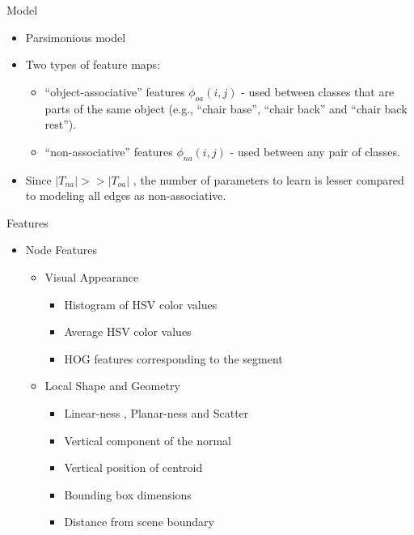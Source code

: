 \documentclass{beamer}
\newcommand{\fe}[3]{{\phi_{#1}(#2,#3)}}%
\begin{document}
\begin{frame}{Model}
\begin{itemize}
\item Parsimonious model

\item Two types of feature maps: 
\begin{itemize}
\item ``object-associative'' features $\fe{oa}{i}{j}$ - used between classes that are parts of the same object (e.g., ``chair base'', ``chair back'' and ``chair back rest''). 
\item ``non-associative'' features $\fe{na}{i}{j}$ -  used between any pair of classes.
\end{itemize}
\item Since $|T_{na}| >> |T_{oa}|$ , the number of parameters to learn is lesser compared to modeling all edges as non-associative.
\end{itemize}
\end{frame}



\begin{frame}{Features}

\begin{itemize}
\item Node Features
\begin{itemize}
\item Visual Appearance
	\begin{itemize}
	\item Histogram of HSV color values
	\item Average HSV color values
	\item HOG features corresponding to the segment
	\end{itemize}
	\item Local Shape and Geometry
	\begin{itemize}
	\item Linear-ness , Planar-ness and Scatter
	\item Vertical component of the normal
	\item Vertical position of centroid
	\item Bounding box dimensions
	\item Distance from scene boundary
	\end{itemize}
\end{itemize}
\end{itemize}

\end{frame}
\end{document}
